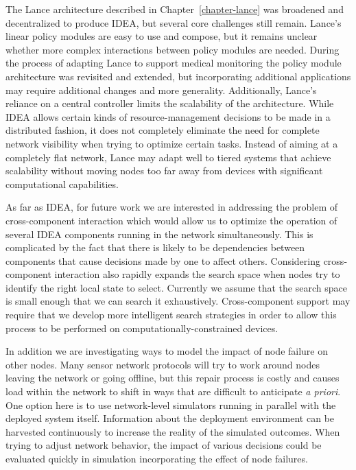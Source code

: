 The Lance architecture described in Chapter~\ref{chapter-lance} was broadened
and decentralized to produce IDEA, but several core challenges still remain.
Lance's linear policy modules are easy to use and compose, but it remains
unclear whether more complex interactions between policy modules are needed.
During the process of adapting Lance to support medical monitoring the policy
module architecture was revisited and extended, but incorporating additional
applications may require additional changes and more generality.
Additionally, Lance's reliance on a central controller limits the scalability
of the architecture. While IDEA allows certain kinds of resource-management
decisions to be made in a distributed fashion, it does not completely
eliminate the need for complete network visibility when trying to optimize
certain tasks. Instead of aiming at a completely flat network, Lance may
adapt well to tiered systems that achieve scalability without moving nodes
too far away from devices with significant computational capabilities.

As far as IDEA, for future work we are interested in addressing the problem
of cross-component interaction which would allow us to optimize the operation
of several IDEA components running in the network simultaneously. This is
complicated by the fact that there is likely to be dependencies between
components that cause decisions made by one to affect others. Considering
cross-component interaction also rapidly expands the search space when nodes
try to identify the right local state to select. Currently we assume that the
search space is small enough that we can search it exhaustively.
Cross-component support may require that we develop more intelligent search
strategies in order to allow this process to be performed on
computationally-constrained devices.

In addition we are investigating ways to model the impact of node failure on
other nodes. Many sensor network protocols will try to work around nodes
leaving the network or going offline, but this repair process is costly and
causes load within the network to shift in ways that are difficult to
anticipate \textit{a priori}. One option here is to use network-level
simulators running in parallel with the deployed system itself. Information
about the deployment environment can be harvested continuously to increase
the reality of the simulated outcomes. When trying to adjust network
behavior, the impact of various decisions could be evaluated quickly in
simulation incorporating the effect of node failures.

